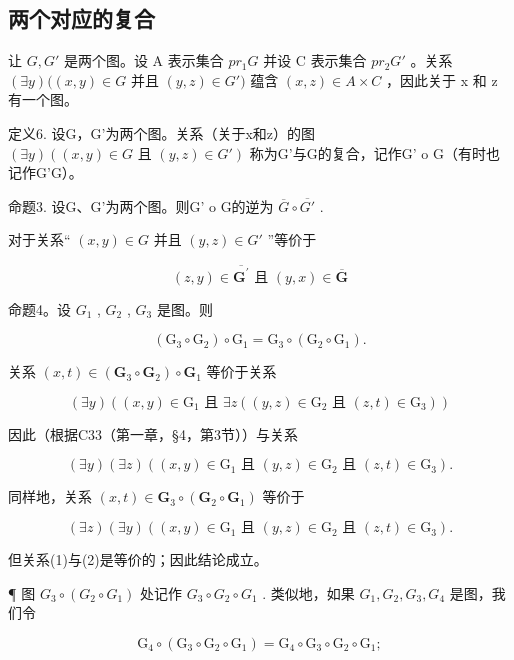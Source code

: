 \subsection{两个对应的复合}

让 \(G, G'\) 是两个图。设 A 表示集合 \(pr_1G\) 并设 C 表示集合 \(pr_2G'\) 。关系 \((\exists y)((x, y) \in G\) 并且 \((y, z) \in G')\) 蕴含 \((x, z) \in A \times C\) ，因此关于 x 和 z 有一个图。

定义6. 设G，G'为两个图。关系（关于x和z）的图 \((\exists y)((x, y) \in G \text{ 且 } (y, z) \in G')\) 称为G'与G的复合，记作G' o G（有时也记作G'G）。

命题3. 设G、G'为两个图。则G' o G的逆为 \(\overline{G} \circ \overline{G'}\) .

对于关系“ \((x, y) \in G\) 并且 \((y, z) \in G'\) ”等价于

\[
(z, y) \in \overline {{\mathbf {G} ^ {\prime}}} \text {   且   } (y, x) \in \overline {{\mathbf {G}}}
\]

命题4。设 \(G_{1}\) , \(G_{2}\) , \(G_{3}\) 是图。则

\[
\left(\mathrm{G} _ {3} \circ \mathrm{G} _ {2}\right) \circ \mathrm{G} _ {1} = \mathrm{G} _ {3} \circ \left(\mathrm{G} _ {2} \circ \mathrm{G} _ {1}\right).
\]

关系 \((x, t) \in (\mathbf{G}_3 \circ \mathbf{G}_2) \circ \mathbf{G}_1\) 等价于关系

\[
(\exists y) ((x, y) \in \mathrm{G} _ {1} \text {   且   } \exists z ((y, z) \in \mathrm{G} _ {2} \text {   且   } (z, t) \in \mathrm{G} _ {3}))
\]

因此（根据C33（第一章，§4，第3节））与关系

\[
(\exists y) (\exists z) ((x, y) \in \mathrm{G} _ {1} \text {   且   } (y, z) \in \mathrm{G} _ {2} \text {   且   } (z, t) \in \mathrm{G} _ {3}).\tag{1}
\]

同样地，关系 \((x, t) \in \mathbf{G}_3 \circ (\mathbf{G}_2 \circ \mathbf{G}_1)\) 等价于

\[
(\exists z) (\exists y) ((x, y) \in \mathrm{G} _ {1} \text {   且   } (y, z) \in \mathrm{G} _ {2} \text {   且   } (z, t) \in \mathrm{G} _ {3}).\tag{2}
\]

但关系(1)与(2)是等价的；因此结论成立。

¶ 图 \(G_{3} \circ (G_{2} \circ G_{1})\) 处记作 \(G_{3} \circ G_{2} \circ G_{1}\) . 类似地，如果 \(G_{1}, G_{2}, G_{3}, G_{4}\) 是图，我们令

\[
\mathrm{G} _ {4} \circ (\mathrm{G} _ {3} \circ \mathrm{G} _ {2} \circ \mathrm{G} _ {1}) = \mathrm{G} _ {4} \circ \mathrm{G} _ {3} \circ \mathrm{G} _ {2} \circ \mathrm{G} _ {1};
\]

